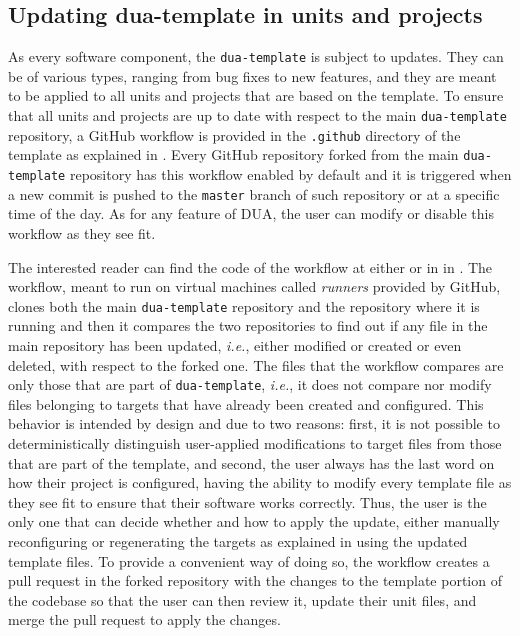 \subsection{Updating dua-template in units and projects}
\label{sec:dua_template_update}
As every software component, the \texttt{dua-template} is subject to updates. They can be of various types, ranging from bug fixes to new features, and they are meant to be applied to all units and projects that are based on the template. To ensure that all units and projects are up to date with respect to the main \texttt{dua-template} repository, a GitHub workflow is provided in the \texttt{.github} directory of the template as explained in . Every GitHub repository forked from the main \texttt{dua-template} repository has this workflow enabled by default and it is triggered when a new commit is pushed to the \texttt{master} branch of such repository or at a specific time of the day. As for any feature of DUA, the user can modify or disable this workflow as they see fit.

The interested reader can find the code of the workflow at either \cite{masocco_dua-template_nodate} or in  in . The workflow, meant to run on virtual machines called \emph{runners} provided by GitHub, clones both the main \texttt{dua-template} repository and the repository where it is running and then it compares the two repositories to find out if any file in the main repository has been updated, \emph{i.e.}, either modified or created or even deleted, with respect to the forked one. The files that the workflow compares are only those that are part of \texttt{dua-template}, \emph{i.e.}, it does not compare nor modify files belonging to targets that have already been created and configured. This behavior is intended by design and due to two reasons: first, it is not possible to deterministically distinguish user-applied modifications to target files from those that are part of the template, and second, the user always has the last word on how their project is configured, having the ability to modify every template file as they see fit to ensure that their software works correctly. Thus, the user is the only one that can decide whether and how to apply the update, either manually reconfiguring or regenerating the targets as explained in  using the updated template files. To provide a convenient way of doing so, the workflow creates a pull request in the forked repository with the changes to the template portion of the codebase so that the user can then review it, update their unit files, and merge the pull request to apply the changes.
